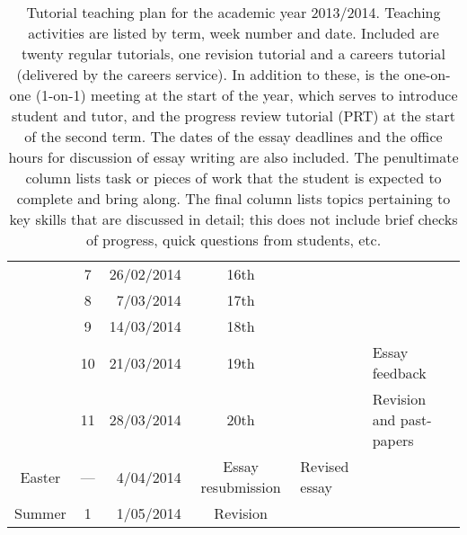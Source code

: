 \begin{table}
\begin{tabular}{c c r c l l}
			 & \hphantom{0}7 &	26/02/2014 & 16th		&			& \\
			 & \hphantom{0}8 &	 7/03/2014 & 17th		&			& \\
			 & \hphantom{0}9 &	14/03/2014 & 18th		&			& \\
			 & 10		 &	21/03/2014 & 19th		&			& Essay feedback \\
			 & 11		 &	28/03/2014 & 20th		&			& Revision and past-papers \\
\midrule
\multirow{1}{*}{Easter} & \multicolumn{1}{c}{---} & 4/04/2014 & Essay resubmission & Revised essay	& \\
\midrule
\multirow{1}{*}{Summer}	 & \hphantom{0}1 &	 1/05/2014 & Revision		&			& \\
 \bottomrule
\end{tabular}
\caption{Tutorial teaching plan for the academic year 2013/2014. Teaching activities are listed by term, week number and date. Included are twenty regular tutorials, one revision tutorial and a careers tutorial (delivered by the careers service). In addition to these, is the one-on-one (1-on-1) meeting at the start of the year, which serves to introduce student and tutor, and the progress review tutorial (PRT) at the start of the second term. The dates of the essay deadlines and the office hours for discussion of essay writing are also included. The penultimate column lists task or pieces of work that the student is expected to complete and bring along. The final column lists topics pertaining to key skills that are discussed in detail; this does not include brief checks of progress, quick questions from students, etc.}\label{tab:2013-14}
\end{table}
